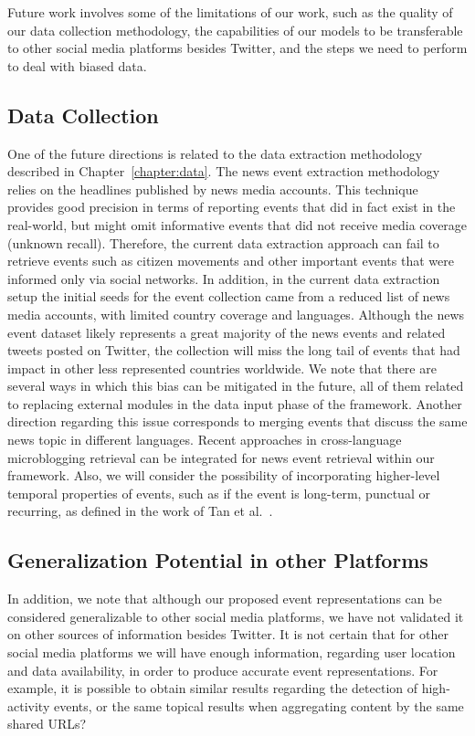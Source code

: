 Future work involves some of the limitations of our work, such as
the quality of our data collection methodology, the capabilities of our models
to be transferable to other social media platforms besides Twitter, and the steps
we need to perform to deal with biased data.

\subsection*{Data Collection}
One of the future directions is related to the data extraction methodology
described in Chapter~\ref{chapter:data}. 
%
The news event extraction methodology relies on the headlines published by news
media accounts. 
%
This technique provides good precision in terms of reporting events that did in
fact exist in the real-world, but might omit informative events that did not
receive media coverage (unknown recall).
%
Therefore, the current data extraction approach can fail to retrieve events such
as citizen movements and other important events that were informed only via
social networks.  
%
In addition, in the current data extraction setup the initial seeds for the
event collection came from a reduced list of news media accounts, with limited
country coverage and languages.
%
Although the news event dataset likely represents a great majority of the news
events and related tweets posted on Twitter, the collection will miss the long
tail of events that had impact in other less represented countries worldwide. 
%
We note that there are several ways in which this bias can be mitigated in the
future, all of them related to replacing external modules in the data input
phase of the framework.
%
Another direction regarding this issue corresponds to merging events that
discuss the same news topic in different languages. 
%
Recent approaches in cross-language microblogging retrieval
\cite{Godavarthy2016} can be integrated for news event retrieval within our
framework.
%
Also, we will consider the possibility of incorporating higher-level temporal
properties of events, such as if the event is long-term, punctual or recurring,
as defined in the work of Tan et al.~\cite{st-model_2009}.


\subsection*{Generalization Potential in other Platforms}
In addition, we note that although our proposed event representations can be
considered generalizable to other social media platforms, we have not validated
it on other sources of information besides Twitter. 
%
It is not certain that for other social media platforms we will have enough
information, regarding user location and data availability, in order to produce
accurate event representations.
%
For example, it is possible to obtain similar results regarding the detection of
high-activity events, or the same topical results when aggregating content by
the same shared URLs?


